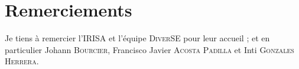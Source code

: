\section*{Remerciements}

\begin{flushright}
Je tiens à remercier l'\textsc{IRISA} et l'équipe \textsc{DiverSE} pour leur accueil ; et en particulier Johann \textsc{Bourcier}, Francisco Javier \textsc{Acosta Padilla} et Inti \textsc{Gonzales Herrera}.
\end{flushright}
